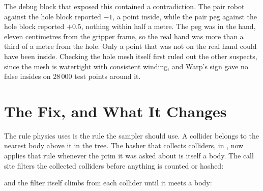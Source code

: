 \begin{myfigure}
\end{myfigure}

The debug block that exposed this contained a contradiction. The pair robot against the hole block reported $-1$, a point inside, while the pair peg against the hole block reported $+0.5$, nothing within half a metre. The peg was in the hand, eleven centimetres from the gripper frame, so the real hand was more than a third of a metre from the hole. Only a point that was not on the real hand could have been inside. Checking the hole mesh itself first ruled out the other suspects, since the mesh is watertight with consistent winding, and Warp's sign gave no false insides on 28\,000 test points around it.

\section{The Fix, and What It Changes}
\label{sec:fix}

The rule physics uses is the rule the sampler should use. A collider belongs to the nearest body above it in the tree. The hasher that collects colliders,  in , now applies that rule whenever the prim it was asked about is itself a body. The call site filters the collected colliders before anything is counted or hashed:



and the filter itself climbs from each collider until it meets a body:




